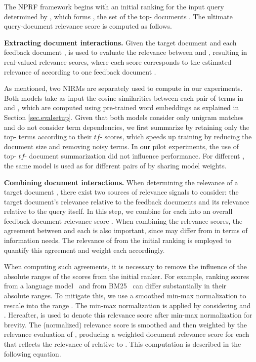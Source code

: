 \documentclass[11pt,a4paper]{article}
\newcommand{\tf}{\ensuremath{\mathit{tf}}}
\begin{document}
The NPRF framework begins with an initial ranking for the input query  determined by , which forms , the set of the top- documents .  
The ultimate query-document relevance score  is computed as follows.

\textbf{Extracting document interactions.}
Given the target document  and each feedback document ,
 is used to evaluate the relevance between  and ,
resulting in  real-valued relevance scores, where each score corresponds to the estimated relevance of  according to one feedback document .

As mentioned, two NIRMs
are separately used to compute  in our experiments.
Both models take as input the cosine similarities between each pair of terms in  and , which are computed using
pre-trained word embeddings as explained in Section \ref{sec.evalsetup}. Given that both models consider only unigram matches and do not consider term dependencies,
we first summarize  by retaining only the 
top- terms according to their \tf- scores,
which speeds up training by reducing the document size and removing noisy terms.
In our pilot experiments, the use of top- \tf- document summarization did not influence performance.
For different , 
the same model is used as  for different pairs of  by sharing model weights.

\textbf{Combining document interactions.} 
When determining the relevance of a target document ,
there exist two sources of relevance signals to consider: the target document's relevance relative to
the feedback documents  and its relevance relative to the query  itself.
In this step, we combine  for each 
into an overall feedback document relevance score .
When combining the relevance scores,
the agreement between  and each  is also important, since  may differ from  in terms of information needs. 
The relevance of  from the initial ranking  is 
employed to quantify this agreement and weight each  accordingly.

When computing such agreements, it is necessary to remove the influence of the absolute ranges of the scores from the initial ranker.
For example, ranking scores from a language model~\cite{DBLP:conf/sigir/PonteC98} and from BM25~\cite{DBLP:conf/trec/RobertsonWHGP95} can differ substantially in their absolute ranges.
To mitigate this, we use a smoothed min-max normalization to rescale 
 into the range .
The min-max normalization is applied by considering
 and 
.
Hereafter, 
  is used to denote this
relevance score after min-max normalization for brevity.
The (normalized) relevance score is smoothed and then weighted by the relevance evaluation of ,
producing a weighted document relevance score  for each 
that reflects the relevance of  relative to .
This computation is described in the following equation.
\end{document}
